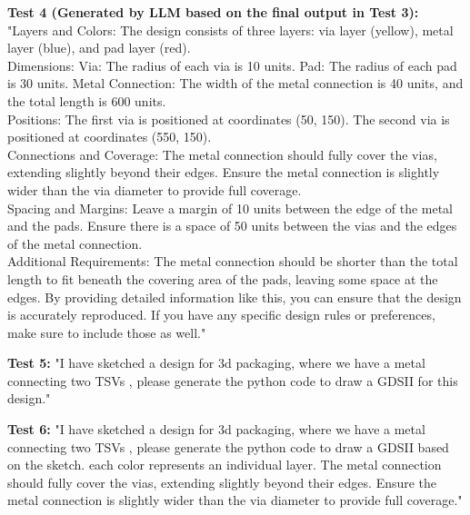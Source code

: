 \documentclass{article}
\begin{document}
\textbf{Test 4 (Generated by LLM based on the final output in Test 3):}\\
"Layers and Colors:
The design consists of three layers: via layer (yellow), metal layer (blue), and pad layer (red).\\
Dimensions:
Via: The radius of each via is 10 units.
Pad: The radius of each pad is 30 units.
Metal Connection: The width of the metal connection is 40 units, and the total length is 600 units.\\
Positions:
The first via is positioned at coordinates (50, 150).
The second via is positioned at coordinates (550, 150).\\
Connections and Coverage:
The metal connection should fully cover the vias, extending slightly beyond their edges.
Ensure the metal connection is slightly wider than the via diameter to provide full coverage.\\
Spacing and Margins:
Leave a margin of 10 units between the edge of the metal and the pads.
Ensure there is a space of 50 units between the vias and the edges of the metal connection.\\
Additional Requirements:
The metal connection should be shorter than the total length to fit beneath the covering area of the pads, leaving some space at the edges.
By providing detailed information like this, you can ensure that the design is accurately reproduced. If you have any specific design rules or preferences, make sure to include those as well."

\textbf{Test 5:} "I have sketched a design for 3d packaging, where we have a metal connecting two TSVs , please generate the python code to draw a GDSII for this design."

\textbf{Test 6:} "I have sketched a design for 3d packaging, where we have a metal connecting two TSVs , please generate the python code to draw a GDSII based on the sketch. each color represents an individual layer. The metal connection should fully cover the vias, extending slightly beyond their edges. Ensure the metal connection is slightly wider than the via diameter to provide full coverage."
\end{document}
